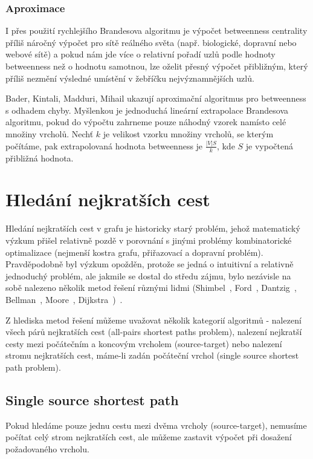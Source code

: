 \documentclass{bakalarka}
\begin{document}
\subsubsection{Aproximace}
I přes použití rychlejšího Brandesova algoritmu je výpočet betweenness
centrality příliš náročný výpočet pro sítě reálného světa (např. biologické,
dopravní nebo webové sítě) a pokud nám jde více o relativní pořadí uzlů podle
hodnoty betweenness než o hodnotu samotnou, lze oželit přesný výpočet
přibližným, který příliš nezmění výsledné umístění v žebříčku nejvýznamnějších
uzlů.

Bader, Kintali, Madduri, Mihail ukazují aproximační algoritmus pro betweenness
s odhadem chyby.  Myšlenkou je jednoduchá lineární extrapolace Brandesova
algoritmu, pokud do výpočtu zahrneme pouze náhodný vzorek namísto celé množiny
vrcholů. Nechť $k$ je velikost vzorku množiny vrcholů, se kterým počítáme, pak
extrapolovaná hodnota betweenness je $\frac{|V| S}{k}$, kde $S$ je vypočtená
přibližná hodnota.


\section{Hledání nejkratších cest}
Hledání nejkratších cest v grafu je historicky starý problém, jehož matematický
výzkum přišel relativně pozdě v porovnání s jinými problémy kombinatorické
optimalizace (nejmenší kostra grafu, přiřazovací a dopravní problém).
Pravděpodobně byl výzkum opožděn, protože se jedná o intuitivní a relativně
jednoduchý problém, ale jakmile se dostal do středu zájmu, bylo nezávisle na
sobě nalezeno několik metod řešení různými lidmi (Shimbel~\citep{shimbel1955},
Ford~\citep{ford1956}, Dantzig~\citep{dantzig1957},
Bellman~\citep{bellmanford_algorithm}, Moore~\citep{moore1959},
Dijkstra~\citep{dijkstra1959})~\citep{schrijver2012}.


Z hlediska metod řešení můžeme uvažovat několik kategorií algoritmů - nalezení
všech párů nejkratších cest (all-pairs shortest paths problem), nalezení
nejkratší cesty mezi počátečním a koncovým vrcholem (source-target) nebo
nalezení stromu nejkratších cest, máme-li zadán počáteční vrchol (single source
shortest path problem).


\subsection{Single source shortest path}
Pokud hledáme pouze jednu cestu mezi dvěma vrcholy (source-target), nemusíme
počítat celý strom nejkratších cest, ale můžeme zastavit výpočet při dosažení
požadovaného vrcholu. 
\end{document}
